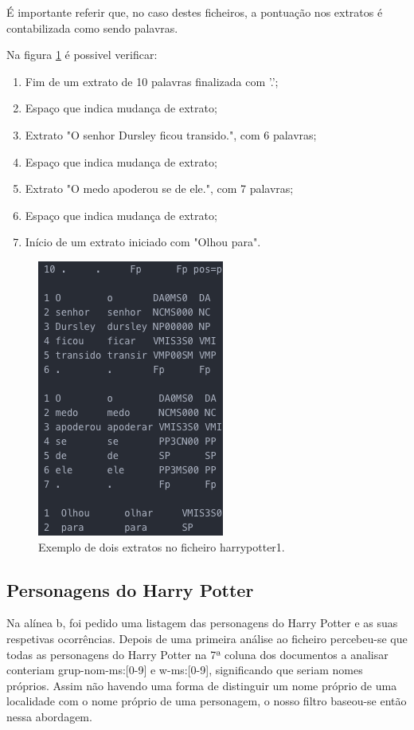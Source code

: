 \documentclass[11pt,a4paper]{report}
\begin{document}
É importante referir que, no caso destes ficheiros, a pontuação nos extratos é contabilizada como sendo palavras.

\vspace{0.5cm}

Na figura \ref{img:analise1} é possivel verificar:

\begin{enumerate}
 \item Fim de um extrato de 10 palavras finalizada com '.';
 \item Espaço que indica mudança de extrato;
 \item Extrato "O senhor Dursley ficou transido.", com 6 palavras;
 \item Espaço que indica mudança de extrato;
 \item Extrato "O medo apoderou se de ele.", com 7 palavras;
 \item Espaço que indica mudança de extrato;
 \item Início de um extrato iniciado com "Olhou para".
\end{enumerate}

\begin{figure}[H]
\centering
\includegraphics[scale=0.6]{analise1.png}
\caption{Exemplo de dois extratos no ficheiro harrypotter1.}
\label{img:analise1}
\end{figure}

\subsection{Personagens do Harry Potter}
\label{subsec:analise2}

Na alínea b, foi pedido uma listagem das personagens do Harry Potter e as suas respetivas ocorrências. Depois de uma primeira análise ao ficheiro percebeu-se que todas as personagens do Harry Potter na 7ª coluna dos documentos a analisar conteriam grup-nom-ms:[0-9] e w-ms:[0-9], significando que seriam nomes próprios. Assim não havendo uma forma de distinguir um nome próprio de uma localidade com o nome próprio de uma personagem, o nosso filtro baseou-se então nessa abordagem.
\end{document}
